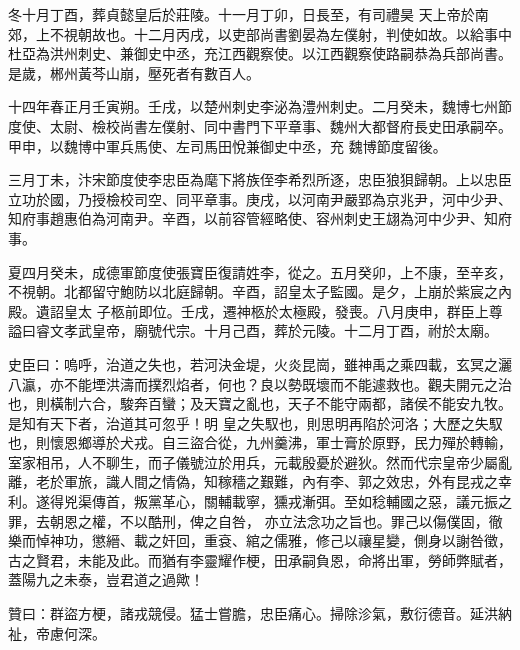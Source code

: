 \begin{pinyinscope}
 冬十月丁酉，葬貞懿皇后於莊陵。十一月丁卯，日長至，有司禮昊
 天上帝於南郊，上不視朝故也。十二月丙戌，以吏部尚書劉晏為左僕射，判使如故。以給事中杜亞為洪州刺史、兼御史中丞，充江西觀察使。以江西觀察使路嗣恭為兵部尚書。是歲，郴州黃芩山崩，壓死者有數百人。



 十四年春正月壬寅朔。壬戌，以楚州刺史李泌為澧州刺史。二月癸未，魏博七州節度使、太尉、檢校尚書左僕射、同中書門下平章事、魏州大都督府長史田承嗣卒。甲申，以魏博中軍兵馬使、左司馬田悅兼御史中丞，充
 魏博節度留後。



 三月丁未，汴宋節度使李忠臣為麾下將族侄李希烈所逐，忠臣狼狽歸朝。上以忠臣立功於國，乃授檢校司空、同平章事。庚戌，以河南尹嚴郢為京兆尹，河中少尹、知府事趙惠伯為河南尹。辛酉，以前容管經略使、容州刺史王翃為河中少尹、知府事。



 夏四月癸未，成德軍節度使張寶臣復請姓李，從之。五月癸卯，上不康，至辛亥，不視朝。北都留守鮑防以北庭歸朝。辛酉，詔皇太子監國。是夕，上崩於紫宸之內殿。遺詔皇太
 子柩前即位。壬戌，遷神柩於太極殿，發喪。八月庚申，群臣上尊謚曰睿文孝武皇帝，廟號代宗。十月己酉，葬於元陵。十二月丁酉，祔於太廟。



 史臣曰：嗚呼，治道之失也，若河決金堤，火炎昆崗，雖神禹之乘四載，玄冥之灑八瀛，亦不能堙洪濤而撲烈焰者，何也？良以勢既壞而不能遽救也。觀夫開元之治也，則橫制六合，駿奔百蠻；及天寶之亂也，天子不能守兩都，諸侯不能安九牧。是知有天下者，治道其可忽乎！明
 皇之失馭也，則思明再陷於河洛；大歷之失馭也，則懷恩鄉導於犬戎。自三盜合從，九州羹沸，軍士膏於原野，民力殫於轉輸，室家相吊，人不聊生，而子儀號泣於用兵，元載殷憂於避狄。然而代宗皇帝少屬亂離，老於軍旅，識人間之情偽，知稼穡之艱難，內有李、郭之效忠，外有昆戎之幸利。遂得兇渠傳首，叛黨革心，關輔載寧，獯戎漸弭。至如稔輔國之惡，議元振之罪，去朝恩之權，不以酷刑，俾之自咎，
 亦立法念功之旨也。罪己以傷僕固，徹樂而悼神功，懲縉、載之奸回，重袞、綰之儒雅，修己以禳星變，側身以謝咎徵，古之賢君，未能及此。而猶有李靈耀作梗，田承嗣負恩，命將出軍，勞師弊賦者，蓋陽九之未泰，豈君道之過歟！



 贊曰：群盜方梗，諸戎競侵。猛士嘗膽，忠臣痛心。掃除沴氣，敷衍德音。延洪納祉，帝慮何深。



\end{pinyinscope}